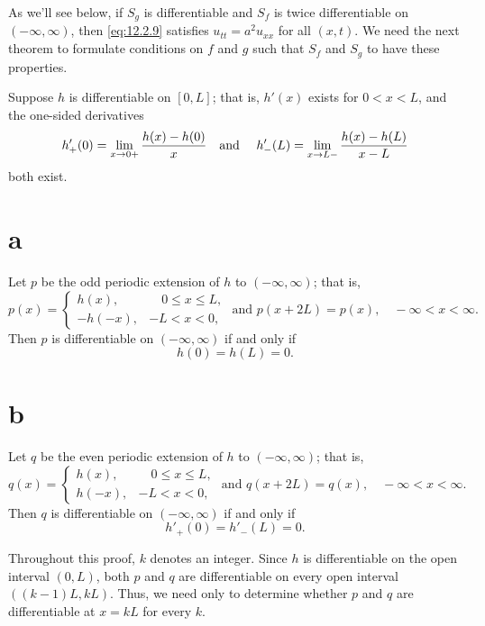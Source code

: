 As we'll see below, if $S_{g}$ is differentiable and $S_{f}$ is twice differentiable on
$(-\infty,\infty)$, then \eqref{eq:12.2.9} satisfies $u_{tt}=a^{2}u_{xx}$ for all $(x,t)$. We need
the next theorem to formulate conditions on $f$ and $g$ such that $S_{f}$ and $S_{g}$ to have these
properties.

\begin{theorem}
  \color{blue}
  \label{thmtype:12.2.3} Suppose $h$ is differentiable on $[0,L]$; that is, $h'(x)$ exists for
  $0<x<L$, and the one-sided derivatives
  \[
    h'_{+}(0)=\lim_{x\to0+}\frac{h(x)-h(0)}{x}\mbox{\quad and \quad}h'_{-}(L)=\lim_{x\to L-}\frac{h(x)-h(L)}{x-L}
  \]
  both exist.

\part{a} Let $p$ be the odd periodic extension of $h$ to $(-\infty,\infty)$; that is,
  \[
    p(x)= \left\{
    \begin{array}{cl}
      h(x),   & \quad0\le x\le L, \\
      -h(-x), & -L<x<0,
    \end{array}\right. \mbox{\  and\  }p(x+2L)=p(x),\quad-\infty<x<\infty.
  \]
  Then $p$ is differentiable on $(-\infty,\infty)$ if and only if
  \begin{equation}
    \label{eq:12.2.13}h(0)=h(L)=0.
  \end{equation}

\part{b} Let $q$ be the even periodic extension of $h$ to $(-\infty,\infty)$; that is,
  \[
    q(x)= \left\{
    \begin{array}{cl}
      h(x),  & \quad0\le x\le L, \\
      h(-x), & -L<x<0,
    \end{array}\right. \mbox{\  and\  }q(x+2L)=q(x),\quad-\infty<x<\infty.
  \]
  Then $q$ is differentiable on $(-\infty,\infty)$ if and only if
  \begin{equation}
    \label{eq:12.2.14}h'_{+}(0)=h'_{-}(L)=0.
  \end{equation}
\end{theorem}

\proof Throughout this proof, $k$ denotes an integer. Since $h$ is differentiable on the open
interval $(0,L)$, both $p$ and $q$ are differentiable on every open interval $((k-1)L,kL)$. Thus, we
need only to determine whether $p$ and $q$ are differentiable at $x=kL$ for every $k$.

